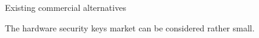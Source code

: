 \chap[alternatives] Existing commercial alternatives

The hardware security keys market can be considered rather small. 